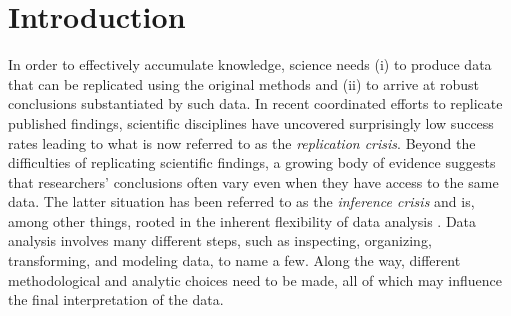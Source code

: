 \documentclass[Review,times,sageh]{sagej}
\begin{document}

\maketitle

\hypertarget{introduction}{%
\section{Introduction}\label{introduction}}

In order to effectively accumulate knowledge, science needs (i) to produce data that can be replicated using the original methods and (ii) to arrive at robust conclusions substantiated by such data.
In recent coordinated efforts to replicate published findings, scientific disciplines have uncovered surprisingly low success rates \citep[e.g.,][]{open2015estimating, camerer2018evaluating} leading to what is now referred to as the \emph{replication crisis}.
Beyond the difficulties of replicating scientific findings, a growing body of evidence suggests that researchers' conclusions often vary even when they have access to the same data.
The latter situation has been referred to as the \emph{inference crisis} \citep{rotello2015more, starns2019assessing} and is, among other things, rooted in the inherent flexibility of data analysis \citep[often referred to as researcher degrees of freedom:][]{simmons2011false, gelman2014statistical}.
Data analysis involves many different steps, such as inspecting, organizing, transforming, and modeling data, to name a few.
Along the way, different methodological and analytic choices need to be made, all of which may influence the final interpretation of the data.
\end{document}

